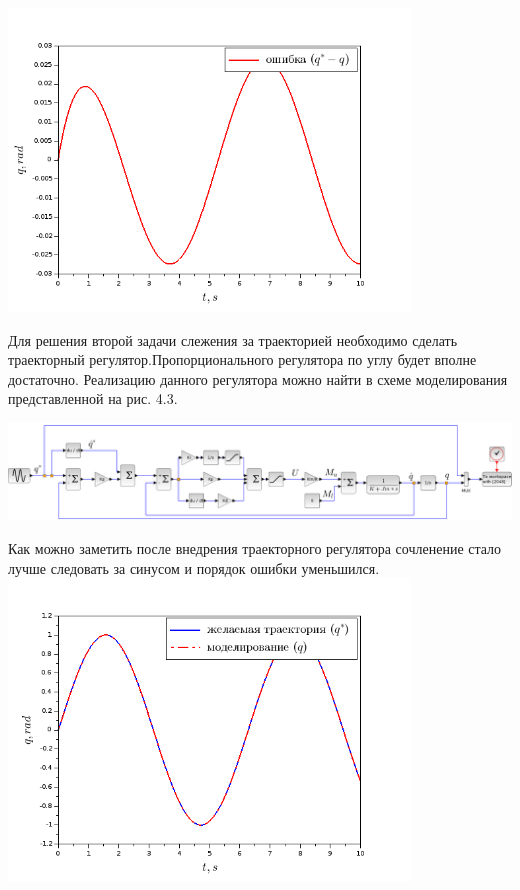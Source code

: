 \begin{center}
    \includegraphics[width=0.8\textwidth]{Lab4/images/Error_without.png}\\
\end{center}
\vspace{1cm}
Для решения второй задачи слежения за траекторией необходимо сделать траекторный регулятор.Пропорционального регулятора по углу будет вполне достаточно. Реализацию данного регулятора можно найти в схеме моделирования представленной на рис. 4.3. \\
\vspace{1cm}
\begin{center}
    \includegraphics[width=\textwidth]{Lab4/images/Scheme_with.png}\\
\end{center}
\begin{center}
Как можно заметить после внедрения траекторного регулятора сочленение стало лучше следовать за синусом и порядок ошибки уменьшился.
    \includegraphics[width=0.8\textwidth]{Lab4/images/Pict_with.png}\\
\end{center}

